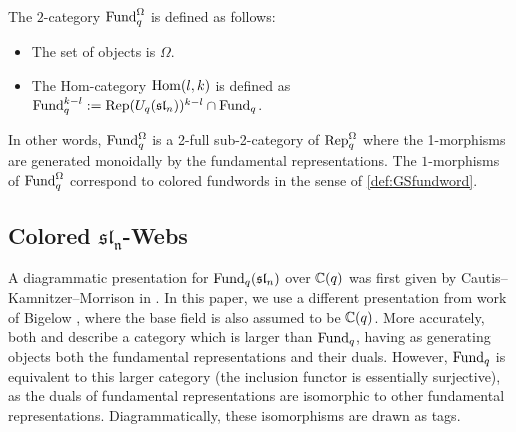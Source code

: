 \begin{definition}\label{defn- qFund Omega}
 The $2$-category $\operatorname{Fund}_q^{\Omega}$ is defined as follows:
  \begin{itemize}
      \item The set of objects is $\Omega$.
      \item The Hom-category $\operatorname{Hom}(l,k)$ is defined as $\operatorname{Fund}_q^{k-l} := \operatorname{Rep}(U_q(\mathfrak{sl}_n))^{k-l} \cap \operatorname{Fund}_q$.
\end{itemize}
      
\end{definition}

In other words, $\operatorname{Fund}_q^{\Omega}$ is a 2-full sub-2-category of $\operatorname{Rep}_q^{\Omega}$ where the 1-morphisms are generated monoidally by the fundamental representations. The $1$-morphisms of $\operatorname{Fund}_q^{\Omega}$ correspond to colored fundwords in the sense of \cref{def:GSfundword}.

\subsection{Colored \texorpdfstring{$\mathfrak{sl_n}$}{sl\_n}-Webs}\label{subsec-colored sln webs}


A diagrammatic presentation for $\operatorname{Fund}_q(\mathfrak{sl}_n)$ over $\mathbb{C}(q)$ was first given by Cautis--Kamnitzer--Morrison in \cite{CKM}. In this paper, we use a different presentation from work of Bigelow \cite{Bigelow}, where the base field is also assumed to be $\mathbb{C}(q)$.  More accurately, both \cite{CKM} and \cite{Bigelow} describe a category which is larger than $\operatorname{Fund}_q$, having as generating objects both the fundamental representations and their duals. However, $\operatorname{Fund}_q$ is equivalent to this larger category (the inclusion functor is essentially surjective), as the duals of fundamental representations are isomorphic to other fundamental representations. Diagrammatically, these isomorphisms are drawn as tags.

